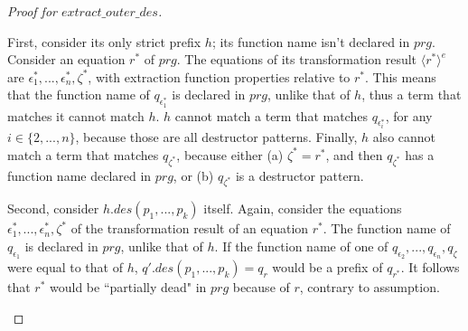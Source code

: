 \documentclass[11pt]{article} %
\begin{document}
\begin{proof}[Proof for $extract\_outer\_des$]
\begin{itemize}
\begin{itemize}
First, consider its only strict prefix $h$; its function name isn't declared in $prg$. Consider an equation $r^*$ of $prg$. The equations of its transformation result $\langle r^* \rangle^e$ are $\epsilon^*_1, ..., \epsilon^*_n, \zeta^*$, with extraction function properties relative to $r^*$. This means that the function name of $q_{\epsilon^*_1}$ is declared in $prg$, unlike that of $h$, thus a term that matches it cannot match $h$. $h$ cannot match a term that matches $q_{\epsilon^*_i}$, for any $i \in \{2, ..., n\}$, because those are all destructor patterns. Finally, $h$ also cannot match a term that matches $q_{\zeta^*}$, because either (a) $\zeta^* = r^*$, and then $q_{\zeta^*}$ has a function name declared in $prg$, or (b) $q_{\zeta^*}$ is a destructor pattern.

Second, consider $h.des(p_1, ..., p_k)$ itself. Again, consider the equations $\epsilon^*_1, ..., \epsilon^*_n, \zeta^*$ of the transformation result of an equation $r^*$. The function name of $q_{\epsilon_1}$ is declared in $prg$, unlike that of $h$. If the function name of one of $q_{\epsilon_2}, ..., q_{\epsilon_n}, q_\zeta$ were equal to that of $h$, $q'.des(p_1, ..., p_k) = q_r$ would be a prefix of $q_{r^*}$. It follows that $r^*$ would be ``partially dead" in $prg$ because of $r$, contrary to assumption.

\end{itemize}

\end{itemize}


\end{proof}
\end{document}

